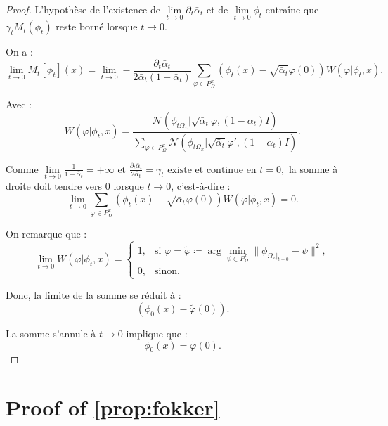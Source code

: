 \documentclass[a4paper,10pt]{article}
\theoremstyle{definition} %
\theoremstyle{definition} %
\theoremstyle{definition} %
\theoremstyle{definition} %
\begin{document}
\begin{proof}
    L’hypothèse de l’existence de \( \lim\limits_{t \to 0} \partial_t \bar \alpha_t \) et de \( \lim\limits_{t \to 0} \phi_t \) entraîne que \( \gamma_t M_t(\phi_t) \) reste borné lorsque \( t \to 0 \).

    On a :
    \[
    \lim\limits_{t \to 0} M_t [\phi_t] (x) = \lim\limits_{t \to 0} - \frac{\partial_t \bar \alpha_t}{2\bar  \alpha_t (1 - \bar \alpha_t)} \sum_{\varphi \in P_{\Omega}^{x}} \left(\phi_t(x) - \sqrt{\bar{\alpha}_t} \varphi(0)\right) W(\varphi | \phi_t, x).
    \]
    
    Avec :
    \[
    W(\varphi | \phi_t, x) = \frac{\mathcal{N}(\phi_{t\Omega_x} | \sqrt{\bar{\alpha}_t} \varphi, (1 - \alpha_t)I)}
    {\sum\limits_{\varphi \in P_{\Omega}^{x}} \mathcal{N}(\phi_{t\Omega_x} | \sqrt{\bar{\alpha}_t} \varphi', (1 - \alpha_t)I)}.
    \]

    Comme $
    \lim\limits_{t \to 0} \frac{1}{1 - \bar \alpha_t} = +\infty 
    \text{ et } 
    \frac{\partial_t \bar \alpha_t}{2 \bar \alpha_t} = \gamma_t \text{ existe et continue en } t=0,$
    la somme à droite doit tendre vers 0 lorsque \( t \to 0 \), c'est-à-dire :    
    \[
    \lim\limits_{t \to 0} \sum_{\varphi \in P_{\Omega}^{x}} \left(\phi_t(x) - \sqrt{\bar{\alpha}_t} \varphi(0)\right) W(\varphi | \phi_t, x) = 0.
    \]
    
    On remarque que :    
    \[
    \lim\limits_{t \to 0} W(\varphi | \phi_t, x) =
    \begin{cases} 
    1, & \text{si } \varphi = \tilde{\varphi} \coloneqq \arg\min\limits_{\psi \in P_{\Omega}^{x}} \|\phi_{\Omega_{x}|_{t=0}} - \psi \|^2, \\
    0, & \text{sinon}.
    \end{cases}
    \]
    
    Donc, la limite de la somme se réduit à :    
    \[
    (\phi_0(x) - \tilde{\varphi}(0)).
    \]
    
    La somme s’annule à \( t \to 0 \) implique que :    
    \[
    \phi_0(x) = \tilde{\varphi}(0).
    \]
\end{proof}




\appendix

\section{Proof of \cref{prop:fokker} \label{sec:proof_focker}}
\end{document}
